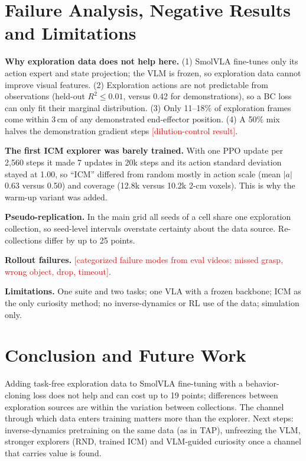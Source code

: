 \documentclass[conference]{IEEEtran}
\newcommand{\pending}[1]{\textcolor{red}{[#1]}}
\begin{document}
\section{Failure Analysis, Negative Results and Limitations}
\textbf{Why exploration data does not help here.} (1) SmolVLA fine-tunes only its action expert and state projection; the VLM is frozen, so exploration data cannot improve visual features. (2) Exploration actions are not predictable from observations (held-out $R^2\le0.01$, versus 0.42 for demonstrations), so a BC loss can only fit their marginal distribution. (3) Only 11--18\% of exploration frames come within 3\,cm of any demonstrated end-effector position. (4) A 50\% mix halves the demonstration gradient steps \pending{dilution-control result}.

\textbf{The first ICM explorer was barely trained.} With one PPO update per 2{,}560 steps it made 7 updates in 20k steps and its action standard deviation stayed at 1.00, so ``ICM'' differed from random mostly in action scale (mean $|a|$ 0.63 versus 0.50) and coverage (12.8k versus 10.2k 2-cm voxels). This is why the warm-up variant was added.

\textbf{Pseudo-replication.} In the main grid all seeds of a cell share one exploration collection, so seed-level intervals overstate certainty about the data source. Re-collections differ by up to 25 points.

\textbf{Rollout failures.} \pending{categorized failure modes from eval videos: missed grasp, wrong object, drop, timeout}.

\textbf{Limitations.} One suite and two tasks; one VLA with a frozen backbone; ICM as the only curiosity method; no inverse-dynamics or RL use of the data; simulation only.

\section{Conclusion and Future Work}
Adding task-free exploration data to SmolVLA fine-tuning with a behavior-cloning loss does not help and can cost up to 19 points; differences between exploration sources are within the variation between collections. The channel through which data enters training matters more than the explorer. Next steps: inverse-dynamics pretraining on the same data (as in TAP), unfreezing the VLM, stronger explorers (RND, trained ICM) and VLM-guided curiosity once a channel that carries value is found.
\end{document}
